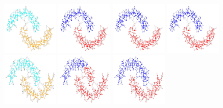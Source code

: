 \documentclass[11pt,twoside]{article}
\theoremstyle{definition}
\newcommand{\1}{\mathbbm{1}}
\begin{document}
\begin{figure}
  \centering
  \includegraphics[width=0.24\textwidth,scale = .5]{row1_true_density_cluster}
  \includegraphics[width=0.24\textwidth]{row1_ppr_cluster}
  \includegraphics[width=0.24\textwidth]{row1_conductance_cluster}
  \includegraphics[width=0.24\textwidth]{row1_density_cluster}
  \includegraphics[width=0.24\textwidth]{row2_true_density_cluster}
  \includegraphics[width=0.24\textwidth]{row2_ppr_cluster}
  \includegraphics[width=0.24\textwidth]{row2_conductance_cluster}

\end{figure}
\end{document}
